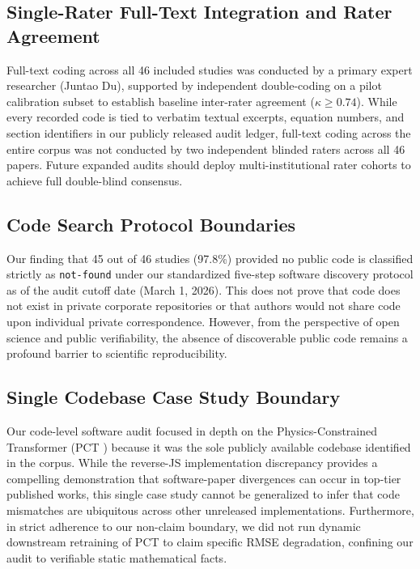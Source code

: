 \documentclass[preprint,3p,times]{elsarticle}
\begin{document}
\subsection{Single-Rater Full-Text Integration and Rater Agreement}
Full-text coding across all 46 included studies was conducted by a primary expert researcher (Juntao Du), supported by independent double-coding on a pilot calibration subset to establish baseline inter-rater agreement ($\kappa \ge 0.74$). While every recorded code is tied to verbatim textual excerpts, equation numbers, and section identifiers in our publicly released audit ledger, full-text coding across the entire corpus was not conducted by two independent blinded raters across all 46 papers. Future expanded audits should deploy multi-institutional rater cohorts to achieve full double-blind consensus.

\subsection{Code Search Protocol Boundaries}
Our finding that 45 out of 46 studies (97.8\%) provided no public code is classified strictly as \texttt{not-found} under our standardized five-step software discovery protocol as of the audit cutoff date (March 1, 2026). This does not prove that code does not exist in private corporate repositories or that authors would not share code upon individual private correspondence. However, from the perspective of open science and public verifiability, the absence of discoverable public code remains a profound barrier to scientific reproducibility.

\subsection{Single Codebase Case Study Boundary}
Our code-level software audit focused in depth on the Physics-Constrained Transformer (PCT \cite{pct2026}) because it was the sole publicly available codebase identified in the corpus. While the reverse-JS implementation discrepancy provides a compelling demonstration that software-paper divergences can occur in top-tier published works, this single case study cannot be generalized to infer that code mismatches are ubiquitous across other unreleased implementations. Furthermore, in strict adherence to our non-claim boundary, we did not run dynamic downstream retraining of PCT to claim specific RMSE degradation, confining our audit to verifiable static mathematical facts.
\end{document}
